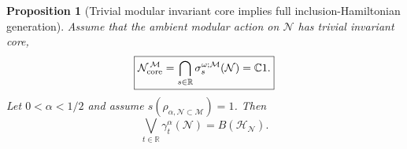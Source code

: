 \documentclass[a4paper,11pt]{article}
\newtheorem{proposition}[theorem]{Proposition}
\theoremstyle{definition}
\newcommand{\mN}{\mathcal{N}}
\newcommand{\mH}{\mathcal{H}}
\newcommand{\mM}{\mathcal{M}}
\begin{document}
\begin{proposition}[Trivial modular invariant core implies full inclusion-Hamiltonian generation]
\label{prop:Halpha-full-generation}
Assume that the ambient modular action on $\mN$ has trivial invariant core,
\begin{equation}
    \boxed{
    \mN_{\rm core}^{\,\mM}
    =
    \bigcap_{s\in\mathbb R}
    \sigma_s^{\omega;\mM}(\mN)
    =
    \mathbb C1.
    }
    \label{eq:ambient-forgetful-probing}
\end{equation}
Let $0<\alpha<1/2$ and assume
$s(\rho_{\alpha,\mN\subset\mM})=1$. Then
\begin{equation}
    \boxed{
    \bigvee_{t\in\mathbb R}
    \gamma_t^\alpha(\mN)
    =
    B(\mH_{\mN}).
    }
    \label{eq:Halpha-full-BHN}
\end{equation}
\end{proposition}
\end{document}
